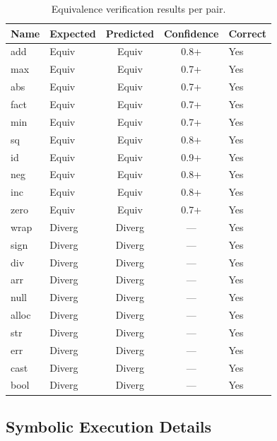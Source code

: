 \documentclass[11pt,a4paper]{article}
\begin{document}
\begin{appendices}
\begin{table}[h]
\centering
\caption{Equivalence verification results per pair.}
\label{tab:equiv-detail}
\begin{tabular}{llccl}
\toprule
Name & Expected & Predicted & Confidence & Correct \\
\midrule
add   & Equiv    & Equiv     & 0.8+  & Yes \\
max   & Equiv    & Equiv     & 0.7+  & Yes \\
abs   & Equiv    & Equiv     & 0.7+  & Yes \\
fact  & Equiv    & Equiv     & 0.7+  & Yes \\
min   & Equiv    & Equiv     & 0.7+  & Yes \\
sq    & Equiv    & Equiv     & 0.8+  & Yes \\
id    & Equiv    & Equiv     & 0.9+  & Yes \\
neg   & Equiv    & Equiv     & 0.8+  & Yes \\
inc   & Equiv    & Equiv     & 0.8+  & Yes \\
zero  & Equiv    & Equiv     & 0.7+  & Yes \\
wrap  & Diverg   & Diverg    & ---   & Yes \\
sign  & Diverg   & Diverg    & ---   & Yes \\
div   & Diverg   & Diverg    & ---   & Yes \\
arr   & Diverg   & Diverg    & ---   & Yes \\
null  & Diverg   & Diverg    & ---   & Yes \\
alloc & Diverg   & Diverg    & ---   & Yes \\
str   & Diverg   & Diverg    & ---   & Yes \\
err   & Diverg   & Diverg    & ---   & Yes \\
cast  & Diverg   & Diverg    & ---   & Yes \\
bool  & Diverg   & Diverg    & ---   & Yes \\
\bottomrule
\end{tabular}
\end{table}

\subsection{Symbolic Execution Details}


\end{appendices}
\end{document}
